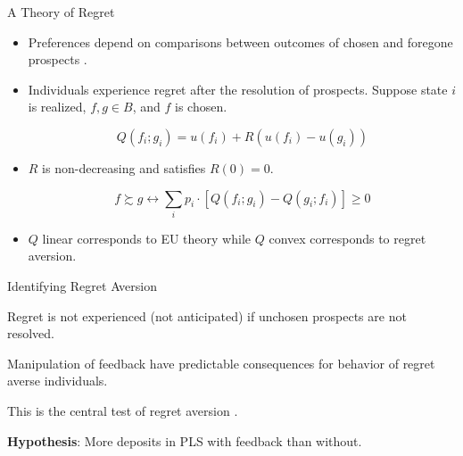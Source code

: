 \documentclass[aspectratio=169]{beamer}
\newenvironment{wideitemize}{\itemize\addtolength{\itemsep}{10pt}}{\enditemize}
\begin{document}
\begin{frame}{A Theory of Regret}

	\begin{itemize}

		\item Preferences depend on comparisons between outcomes of chosen and foregone prospects \parencite{bell_risk_1983,loomes_regret_1982}.

		\item Individuals experience regret after the resolution of prospects. Suppose state $i$ is realized, $f, g \in B$, and $f$ is chosen.

			\[ Q(f_i; g_i) = u(f_i) + R(u(f_i) - u(g_i)) \]

		\item $R$ is non-decreasing and satisfies $R(0) = 0$.

		\[ f \succsim g \leftrightarrow \sum_i p_{i} \cdot [Q(f_i; g_i) - Q(g_i; f_i)] \geq 0 \]

		\item $Q$ linear corresponds to EU theory while $Q$ convex corresponds to regret aversion.

	\end{itemize}
	
\end{frame}

\begin{frame}{Identifying Regret Aversion}

	\begin{wideitemize}

		\item Regret is not experienced (not anticipated) if unchosen prospects are not resolved.


		\item Manipulation of feedback have predictable consequences for behavior of regret averse individuals.


		\item This is the central test of regret aversion \parencite{filiz-ozbay_auctions_2007,zeelenberg_consequences_2004,zeelenberg_consequences_1996}.

		\item \textbf{Hypothesis}: More deposits in PLS with feedback than without.

	\end{wideitemize}

\end{frame}
\end{document}
